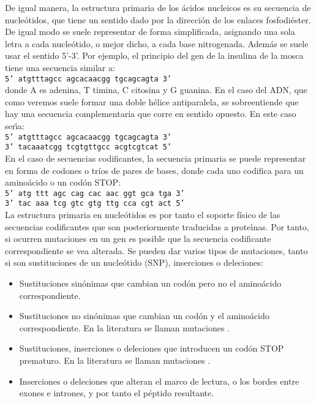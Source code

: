 De igual manera, la estructura primaria de los \'{a}cidos nucleicos es su secuencia de nucle\'{o}tidos, que tiene un sentido
dado por la direcci\'{o}n de los enlaces fosfodi\'{e}ster. De igual modo se suele representar de forma simplificada, asignando
una sola letra a cada nucle\'{o}tido, o mejor dicho, a cada base nitrogenada. Adem\'{a}s se suele usar el sentido 5'-3'.
Por ejemplo, el principio del gen de la insulina de la mosca  tiene una secuencia similar a:\\

\texttt{5' atgtttagcc agcacaacgg tgcagcagta 3'}\\

donde A es adenina, T timina, C citosina y G guanina. En el caso del ADN, que como veremos suele formar una doble h\'{e}lice
antiparalela, se sobreentiende que hay una secuencia complementaria que corre en sentido opuesto. En este caso ser\'\i{}a:\\

\texttt{5' atgtttagcc agcacaacgg tgcagcagta 3'}\\
\texttt{3' tacaaatcgg tcgtgttgcc acgtcgtcat 5'}\\

En el caso de secuencias codificantes, la secuencia primaria se puede representar en forma de codones o tr\'{i}os de pares de bases, donde
cada uno codifica para un amino\'{a}cido o un cod\'{o}n STOP:\\

\texttt{5' atg ttt agc cag cac aac ggt gca tga 3'}\\
\texttt{3' tac aaa tcg gtc gtg ttg cca cgt act 5'}\\

La estructura primaria en nucle\'{o}tidos es por tanto el soporte f\'{i}sico de las secuencias codificantes que son posteriormente 
traducidas a prote\'\i{}nas. Por tanto, si ocurren mutaciones en un gen es posible que la secuencia codificante correspondiente se vea alterada. 
Se pueden dar varios tipos de mutaciones, tanto si son sustituciones de un nucle\'{o}tido (SNP), inserciones o deleciones:

\begin{itemize}
\item Sustituciones sin\'{o}nimas que cambian un cod\'{o}n pero no el amino\'{a}cido correspondiente.
\item Sustituciones no sin\'{o}nimas que cambian un cod\'{o}n y el amino\'{a}cido correspondiente. En la literatura se llaman mutaciones .
\item Sustituciones, inserciones o deleciones que introducen un cod\'{o}n STOP prematuro. En la literatura se llaman mutaciones .
\item Inserciones o deleciones que alteran el marco de lectura, o los bordes entre exones e intrones, y por tanto el p\'{e}ptido resultante.
\end{itemize}


